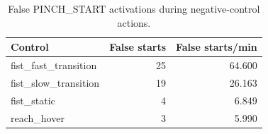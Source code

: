 \begin{table}[t]
\centering
\small
\caption{False PINCH\_START activations during negative-control actions.}
\label{tab:pinch_negative}
\begin{tabular}{lrr}
\hline
Control & False starts & False starts/min \\
\hline
fist\_fast\_transition & 25 & 64.600 \\
fist\_slow\_transition & 19 & 26.163 \\
fist\_static & 4 & 6.849 \\
reach\_hover & 3 & 5.990 \\
\hline
\end{tabular}
\end{table}
